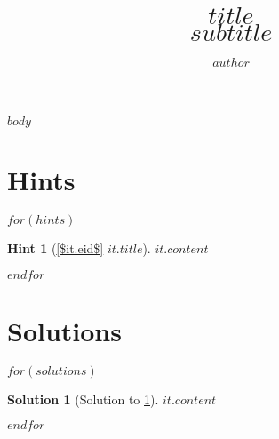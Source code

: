 \documentclass[a4,10pt]{article}
\title{{\bfseries \Huge{$title$}} \\ $subtitle$}
\author{$author$}
\newtheorem{hint}{Hint}
\newtheorem{solution}{Solution}
\begin{document}
\maketitle

$body$

\clearpage
\appendix

\section{Hints}

$for(hints)$
\begin{hint}[{\cref{$it.eid$} $it.title$}]
    \label{$it.id$}
    $it.content$
\end{hint}
$endfor$

\clearpage
\section{Solutions}

$for(solutions)$
\begin{solution}[Solution to \cref{$it.id$}]
    \label{$it.id$:solution}
    $it.content$
\end{solution}
$endfor$
\end{document}
